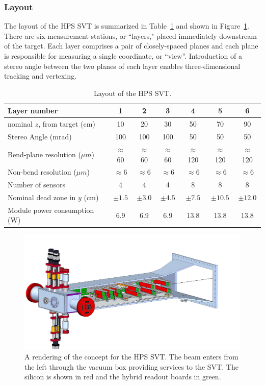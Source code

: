 \subsubsection{Layout}

The layout of the HPS SVT is summarized in Table~\ref{table:svt_layout} and shown in Figure~\ref{figure:svt_layout}. There are six measurement stations, or ``layers," placed immediately downstream of the target. Each layer comprises a pair of closely-spaced planes and each plane is responsible for measuring a single coordinate, or ``view''. Introduction of a stereo angle between the two planes of each layer enables three-dimensional tracking and vertexing.
\begin{table}[h]
\begin{center}
\begin{tabular}{lcccccc}   
\hline \hline 
    Layer number & 1 & 2 & 3 & 4 & 5 & 6 \\      
\hline
    nominal $z$, from target (cm)  & 10 & 20 & 30 & 50 & 70  & 90 \\ 
    Stereo Angle (mrad)  & 100 & 100 & 100 & 50 & 50 & 50 \\ 
    Bend-plane resolution ($\mu m$)  & $\approx$60 & $\approx$60 & $\approx$60 & $\approx$120 & $\approx$120 & $\approx$120 \\ 
    Non-bend resolution ($\mu m$)  & $\approx$6 & $\approx$6 & $\approx$6 & $\approx$6 & $\approx$6  & $\approx$6 \\ 
    Number of sensors  & 4 & 4 & 4 & 8 & 8 & 8 \\ 
    Nominal dead zone in $y$ (cm)  & $\pm1.5$  & $\pm3.0$  & $\pm4.5$  & $\pm7.5$  & $\pm10.5$ & $\pm12.0$  \\ 
    Module power consumption (W) & 6.9 & 6.9 & 6.9 & 13.8 & 13.8 & 13.8 \\
\hline \hline
\end{tabular}
\caption[]{Layout of the HPS SVT.}
\label{table:svt_layout} 
\end{center}
\end{table}
\begin{figure}[ht]
    \includegraphics[width=\textwidth]{svt/figures/10dec6.jpg}
\caption{\small{A rendering of the concept for the HPS SVT.  The beam enters from the left through the vacuum box providing services to the SVT.  The silicon is shown in red and the hybrid readout boards in green.} }
\label{figure:svt_layout}
\end{figure}

